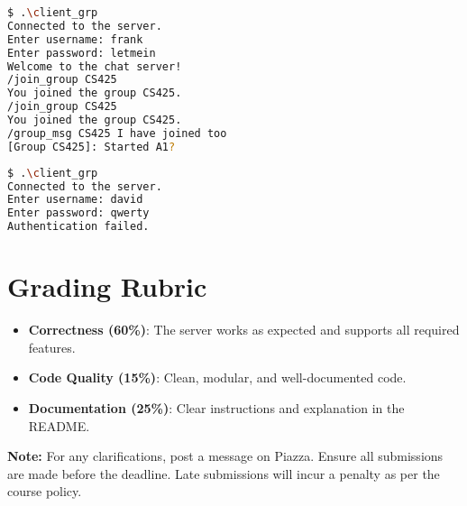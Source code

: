 \documentclass[12pt,a4paper]{article}
\begin{document}
\begin{lstlisting}[language=bash, caption={Running another client in the fourth Terminal; Note that frank does not receive the group message till he joins the group}]
$ .\client_grp
Connected to the server.
Enter username: frank
Enter password: letmein
Welcome to the chat server!
/join_group CS425
You joined the group CS425.
/join_group CS425           
You joined the group CS425.
/group_msg CS425 I have joined too
[Group CS425]: Started A1?
\end{lstlisting}

\begin{lstlisting}[language=bash, caption={Running another client in the fifth Terminal}]
$ .\client_grp
Connected to the server.
Enter username: david
Enter password: qwerty
Authentication failed.
\end{lstlisting}

\section*{Grading Rubric}
\begin{itemize}
    \item \textbf{Correctness (60\%)}: The server works as expected and supports all required features.
    \item \textbf{Code Quality (15\%)}: Clean, modular, and well-documented code.
    \item \textbf{Documentation (25\%)}: Clear instructions and explanation in the README.
\end{itemize}

\vfill
\noindent \textbf{Note:} For any clarifications, post a message on Piazza. Ensure all submissions are made before the deadline. Late submissions will incur a penalty as per the course policy.
\end{document}
